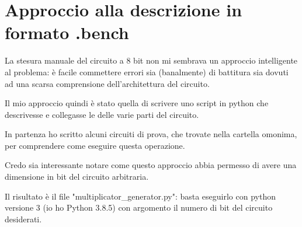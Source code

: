 \documentclass[12pt, letterpaper]{article}
\begin{document}
\section{Approccio alla descrizione in formato .bench}
La stesura manuale del circuito a 8 bit non mi sembrava un approccio intelligente al problema: è facile commettere errori sia (banalmente) di battitura sia dovuti ad una scarsa comprensione dell'architettura del circuito.

Il mio approccio quindi è stato quella di scrivere uno script in python che descrivesse e collegasse le delle varie parti del circuito.  

In partenza ho scritto alcuni circuiti di prova, che trovate nella cartella omonima, per comprendere come eseguire questa operazione. 

Credo sia interessante notare come questo approccio abbia permesso di avere una dimensione in bit del circuito arbitraria.

Il risultato è il file "multiplicator\_generator.py": basta eseguirlo con python versione 3 (io ho Python 3.8.5) con argomento il numero di bit del circuito desiderati.
\end{document}
